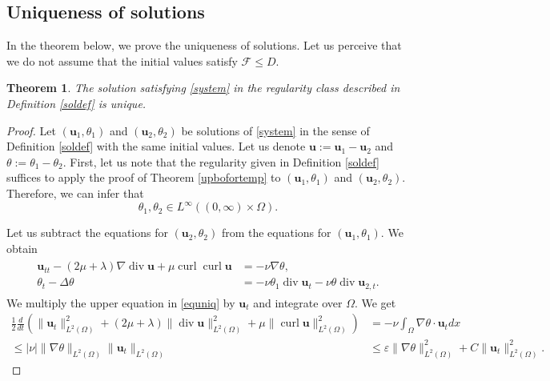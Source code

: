 \documentclass[11pt]{article}
\numberwithin{equation}{section}
\theoremstyle{plain}
\newtheorem{tw}[defi]{Theorem}
\newcommand\bb[1]{\mathbf{#1}}
\newcommand{\tn}{\Omega}
\newcommand{\io}{\int_{\Omega}}
\newcommand{\ld}{L^2(\Omega)}
\newcommand{\ul}{\frac{1}{2}}
\newcommand{\ddt}{\frac{d}{dt}}
\renewcommand{\div}{\operatorname{div}}
\DeclareMathOperator{\curl}{curl}
\newcommand{\F}{\mathcal{F}}
\let \epsilon\varepsilon
\newcommand{\ot}{(0,\infty)\times\Omega}
\newcommand{\wspnd}{2\mu+\lambda}
\begin{document}
\subsection{Uniqueness of solutions}\label{subuniq}
In the theorem below, we prove the uniqueness of solutions. Let us perceive that we do not assume that the initial values satisfy $\F\leq D$.
\begin{tw}
The solution satisfying \eqref{system} in the regularity class described in Definition \ref{soldef} is unique.
\end{tw}
\begin{proof}
Let $(\bb u_1,\theta_1)$ and $(\bb u_2,\theta_2)$ be solutions of \eqref{system} in the sense of Definition \ref{soldef} with the same initial values. Let us denote $\bb u:=\bb u_1-\bb u_2$ and $\theta:=\theta_1-\theta_2$. First, let us note that the regularity given in Definition \ref{soldef} suffices to apply the proof of Theorem \ref{upbofortemp} to $(\bb u_1,\theta_1)$ and $(\bb u_2,\theta_2)$. Therefore, we can infer that
\begin{equation}\label{lith}
\theta_1,\theta_2\in L^{\infty}(\ot).
\end{equation}

Let us subtract the equations for $(\bb u_2,\theta_2)$ from the equations for $(\bb u_1,\theta_1)$. We obtain
\begin{align}\label{equniq}
\begin{split}
\bb u_{tt}-(\wspnd)\nabla\div\bb u +\mu\curl\curl\bb u&=   -\nu\nabla\theta,\\
\theta_t - \Delta \theta &=- \nu\theta_1 \div{\bb u}_{t}-\nu\theta\div\bb u_{2,t}.
\end{split}
\end{align}
We multiply the upper equation in \eqref{equniq} by $\bb u_t$ and integrate over $\tn$. We get
\begin{align}\label{inuuniq}
\nonumber\ul\ddt\left(\|\bb u_t\|^2_{\ld}+(\wspnd)\|\div\bb u\|_{\ld}^2+\mu\|\curl\bb u\|_{\ld}^2\right)&=-\nu\io\nabla\theta\cdot\bb u_t dx\\\leq|\nu|\|\nabla \theta\|_{\ld}\|\bb u_t\|_{\ld}&
\leq\epsilon\|\nabla\theta\|_{\ld}^2 +C\|\bb u_t\|_{\ld}^2.
\end{align}


\end{proof}
\end{document}
